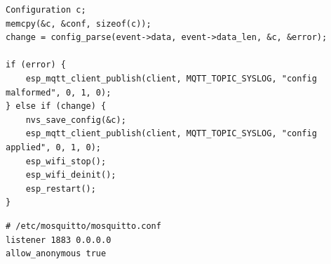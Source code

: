 \begin{lstlisting}[style=cstyle]
Configuration c;
memcpy(&c, &conf, sizeof(c));
change = config_parse(event->data, event->data_len, &c, &error);

if (error) {
    esp_mqtt_client_publish(client, MQTT_TOPIC_SYSLOG, "config malformed", 0, 1, 0);
} else if (change) {
	nvs_save_config(&c);
	esp_mqtt_client_publish(client, MQTT_TOPIC_SYSLOG, "config applied", 0, 1, 0);
	esp_wifi_stop();
	esp_wifi_deinit();
	esp_restart();
}
\end{lstlisting}

\begin{verbatim}
# /etc/mosquitto/mosquitto.conf
listener 1883 0.0.0.0
allow_anonymous true
\end{verbatim}

\emptypage
